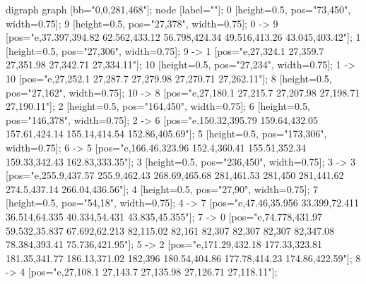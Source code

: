 digraph  graph [bb="0,0,281,468"]; node [label=""]; 0 [height=0.5, pos="73,450", width=0.75]; 9 [height=0.5, pos="27,378", width=0.75]; 0 -> 9 [pos="e,37.397,394.82 62.562,433.12 56.798,424.34 49.516,413.26 43.045,403.42"]; 1 [height=0.5, pos="27,306", width=0.75]; 9 -> 1 [pos="e,27,324.1 27,359.7 27,351.98 27,342.71 27,334.11"]; 10 [height=0.5, pos="27,234", width=0.75]; 1 -> 10 [pos="e,27,252.1 27,287.7 27,279.98 27,270.71 27,262.11"]; 8 [height=0.5, pos="27,162", width=0.75]; 10 -> 8 [pos="e,27,180.1 27,215.7 27,207.98 27,198.71 27,190.11"]; 2 [height=0.5, pos="164,450", width=0.75]; 6 [height=0.5, pos="146,378", width=0.75]; 2 -> 6 [pos="e,150.32,395.79 159.64,432.05 157.61,424.14 155.14,414.54 152.86,405.69"]; 5 [height=0.5, pos="173,306", width=0.75]; 6 -> 5 [pos="e,166.46,323.96 152.4,360.41 155.51,352.34 159.33,342.43 162.83,333.35"]; 3 [height=0.5, pos="236,450", width=0.75]; 3 -> 3 [pos="e,255.9,437.57 255.9,462.43 268.69,465.68 281,461.53 281,450 281,441.62 274.5,437.14 266.04,436.56"]; 4 [height=0.5, pos="27,90", width=0.75]; 7 [height=0.5, pos="54,18", width=0.75]; 4 -> 7 [pos="e,47.46,35.956 33.399,72.411 36.514,64.335 40.334,54.431 43.835,45.355"]; 7 -> 0 [pos="e,74.778,431.97 59.532,35.837 67.692,62.213 82,115.02 82,161 82,307 82,307 82,307 82,347.08 78.384,393.41 75.736,421.95"]; 5 -> 2 [pos="e,171.29,432.18 177.33,323.81 181.35,341.77 186.13,371.02 182,396 180.54,404.86 177.78,414.23 174.86,422.59"]; 8 -> 4 [pos="e,27,108.1 27,143.7 27,135.98 27,126.71 27,118.11"];  {
}

